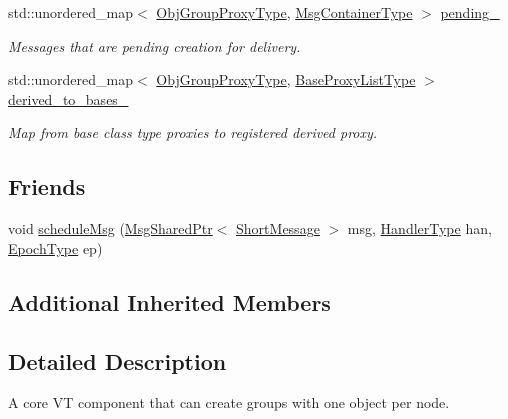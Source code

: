 \begin{DoxyCompactItemize}
std\+::unordered\+\_\+map$<$ \hyperlink{namespacevt_ad7cae989df485fccca57f0792a880a8e}{Obj\+Group\+Proxy\+Type}, \hyperlink{structvt_1_1objgroup_1_1_obj_group_manager_ab89e17bd301b2aa684fce22f0b4af30a}{Msg\+Container\+Type} $>$ \hyperlink{structvt_1_1objgroup_1_1_obj_group_manager_a0254917542e76ec489eb3c5ca6dcf0cd}{pending\+\_\+}
\begin{DoxyCompactList}\small\item\em Messages that are pending creation for delivery. \end{DoxyCompactList}\item 
std\+::unordered\+\_\+map$<$ \hyperlink{namespacevt_ad7cae989df485fccca57f0792a880a8e}{Obj\+Group\+Proxy\+Type}, \hyperlink{structvt_1_1objgroup_1_1_obj_group_manager_a497383a759f7426e824b4f7475b3d5d3}{Base\+Proxy\+List\+Type} $>$ \hyperlink{structvt_1_1objgroup_1_1_obj_group_manager_aee25f043f12ed4447af6974acc5aa4cf}{derived\+\_\+to\+\_\+bases\+\_\+}
\begin{DoxyCompactList}\small\item\em Map from base class type proxies to registered derived proxy. \end{DoxyCompactList}\end{DoxyCompactItemize}
\subsection*{Friends}
\begin{DoxyCompactItemize}
\item 
void \hyperlink{structvt_1_1objgroup_1_1_obj_group_manager_acbc7b3a3d881e2ffbcaeeba5d22f9133}{schedule\+Msg} (\hyperlink{namespacevt_ab2b3d506ec8e8d1540aede826d84a239}{Msg\+Shared\+Ptr}$<$ \hyperlink{namespacevt_a1125ac1da6c0bbf141e0ea0739d7602d}{Short\+Message} $>$ msg, \hyperlink{namespacevt_af64846b57dfcaf104da3ef6967917573}{Handler\+Type} han, \hyperlink{namespacevt_a985a5adf291c34a3ca263b3378388236}{Epoch\+Type} ep)
\end{DoxyCompactItemize}
\subsection*{Additional Inherited Members}


\subsection{Detailed Description}
A core VT component that can create groups with one object per node. 

